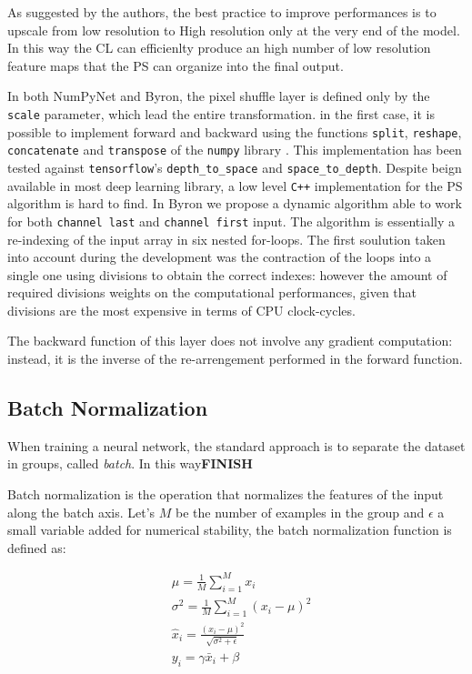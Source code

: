 \documentclass[12pt,a4paper]{report}
\begin{document}
As suggested by the authors, the best practice to improve performances is to upscale from low resolution to High resolution only at the very end of the model. 
In this way the CL can efficienlty produce an high number of low resolution feature maps that the PS can organize into the final output. 

In both NumPyNet and Byron, the pixel shuffle layer is defined only by the \texttt{scale} parameter, which lead the entire transformation.
in the first case, it is possible to implement forward and backward using the functions \texttt{split}, \texttt{reshape}, \texttt{concatenate} and \texttt{transpose} of the \texttt{numpy} library \cite{Numpy}. 
This implementation has been tested against \texttt{tensorflow}'s \texttt{depth\_to\_space} and \texttt{space\_to\_depth}.
Despite beign available in most deep learning library, a low level  \texttt{C++} implementation for the PS algorithm is hard to find. 
In Byron we propose a dynamic algorithm able to work for both \texttt{channel last} and \texttt{channel first} input. 
The algorithm is essentially a re-indexing of the input array in six nested for-loops. The first soulution taken into account during the development was the contraction of the loops into a single one using divisions to obtain the correct indexes: however the amount of required divisions weights on the computational performances, given that divisions are the most expensive in terms of CPU clock-cycles. 

The backward function of this layer does not involve any gradient computation: instead, it is the inverse of the re-arrengement performed in the forward function.

\subsection*{Batch Normalization}

When training a neural network, the standard approach is to separate the dataset in groups, called {\it batch}. In this way{\bf FINISH}

Batch normalization is the operation that normalizes the features of the input along the batch axis.
Let's $M$ be the number of examples in the group and $\epsilon$ a small variable added for numerical stability, the batch normalization function is defined as: 

\begin{align}
  &\mu = \frac{1}{M} \sum_{i=1}^{M} x_i \\
  &\sigma^2 = \frac{1}{M} \sum_{i=1}^{M} (x_i - \mu)^2 \\
  &\hat x_i = \frac{(x_i - \mu)^2}{\sqrt{\sigma^2 + \epsilon}} \\
  &y_i = \gamma \bar x_i + \beta
\end{align}
\end{document}

